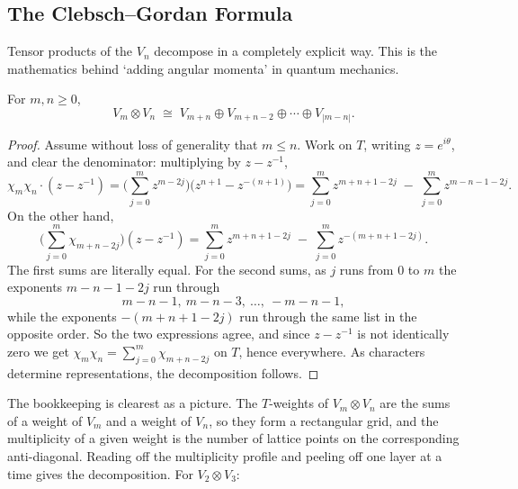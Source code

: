 \documentclass[a4paper]{scrartcl}
\begin{document}
\subsection{The Clebsch--Gordan Formula}

Tensor products of the $V_n$ decompose in a completely explicit way. This is the mathematics behind `adding angular momenta' in quantum mechanics.

\begin{theorem}
	For $m, n\geq0$,
	$$V_m\otimes V_n \; \cong \; V_{m+n}\oplus V_{m+n-2}\oplus\cdots\oplus V_{|m-n|}.$$
\end{theorem}
\begin{proof}
	Assume without loss of generality that $m\leq n$. Work on $T$, writing $z = e^{i\theta}$, and clear the denominator: multiplying by $z - z^{-1}$,
	$$\chi_m\chi_n\cdot(z-z^{-1}) = \Big(\sum_{j=0}^mz^{m-2j}\Big)\big(z^{n+1}-z^{-(n+1)}\big) = \sum_{j=0}^m z^{m+n+1-2j} \; - \; \sum_{j=0}^mz^{m-n-1-2j}.$$
	On the other hand,
	$$\Big(\sum_{j=0}^m\chi_{m+n-2j}\Big)(z-z^{-1}) = \sum_{j=0}^m z^{m+n+1-2j} \; - \; \sum_{j=0}^m z^{-(m+n+1-2j)}.$$
	The first sums are literally equal. For the second sums, as $j$ runs from $0$ to $m$ the exponents $m-n-1-2j$ run through
	$$m-n-1,\ m-n-3,\ \dots,\ -m-n-1,$$
	while the exponents $-(m+n+1-2j)$ run through the same list in the opposite order. So the two expressions agree, and since $z - z^{-1}$ is not identically zero we get $\chi_m\chi_n = \sum_{j=0}^m\chi_{m+n-2j}$ on $T$, hence everywhere. As characters determine representations, the decomposition follows.
\end{proof}

The bookkeeping is clearest as a picture. The $T$-weights of $V_m\otimes V_n$ are the sums of a weight of $V_m$ and a weight of $V_n$, so they form a rectangular grid, and the multiplicity of a given weight is the number of lattice points on the corresponding anti-diagonal. Reading off the multiplicity profile and peeling off one layer at a time gives the decomposition. For $V_2\otimes V_3$:
\end{document}
